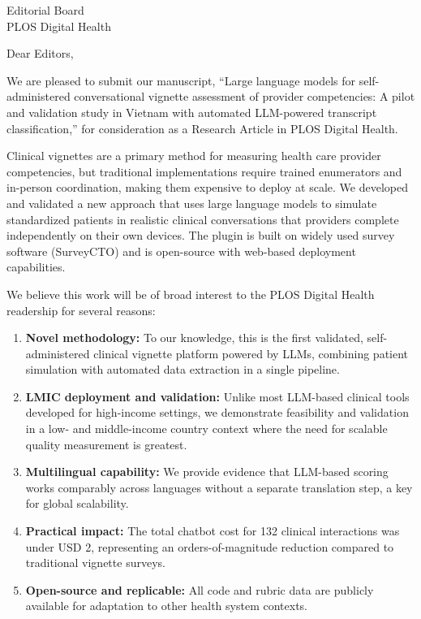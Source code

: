 \documentclass[11pt]{letter}
\date{\today}
\begin{document}
\begin{letter}{Editorial Board\\
PLOS Digital Health}

\opening{Dear Editors,}

We are pleased to submit our manuscript, ``Large language models for self-administered conversational vignette assessment of provider competencies: A pilot and validation study in Vietnam with automated LLM-powered transcript classification,'' for consideration as a Research Article in PLOS Digital Health.

Clinical vignettes are a primary method for measuring health care provider competencies, but traditional implementations require trained enumerators and in-person coordination, making them expensive to deploy at scale. We developed and validated a new approach that uses large language models to simulate standardized patients in realistic clinical conversations that providers complete independently on their own devices. The plugin is built on widely used survey software (SurveyCTO) and is open-source with web-based deployment capabilities.

We believe this work will be of broad interest to the PLOS Digital Health readership for several reasons:

\begin{enumerate}
  \item \textbf{Novel methodology:} To our knowledge, this is the first validated, self-administered clinical vignette platform powered by LLMs, combining patient simulation with automated data extraction in a single pipeline.
  \item \textbf{LMIC deployment and validation:} Unlike most LLM-based clinical tools developed for high-income settings, we demonstrate feasibility and validation in a low- and middle-income country context where the need for scalable quality measurement is greatest.
  \item \textbf{Multilingual capability:} We provide evidence that LLM-based scoring works comparably across languages without a separate translation step, a key for global scalability.
  \item \textbf{Practical impact:} The total chatbot cost for 132 clinical interactions was under USD 2, representing an orders-of-magnitude reduction compared to traditional vignette surveys.
  \item \textbf{Open-source and replicable:} All code and rubric data are publicly available for adaptation to other health system contexts.
\end{enumerate}


\end{letter}
\end{document}
